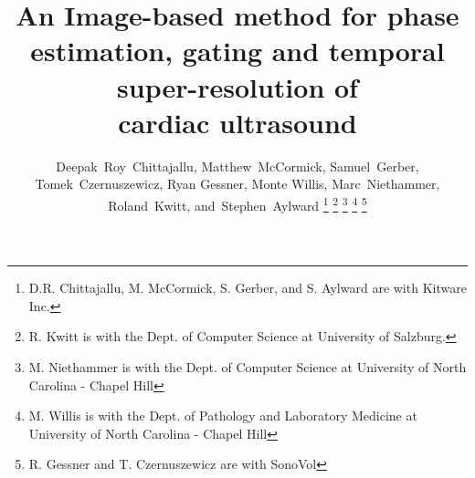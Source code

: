 \documentclass[journal]{IEEEtran}
\begin{document}
%
\title{An Image-based method for phase estimation, gating and temporal super-resolution of \\cardiac ultrasound}
%
%
%

\author{Deepak~Roy~Chittajallu,
        Matthew~McCormick,
        Samuel~Gerber,
        Tomek~Czernuszewicz,
        Ryan Gessner,
        Monte Willis,
        Marc~Niethammer,
        Roland~Kwitt,
        and~Stephen~Aylward%
\thanks{D.R. Chittajallu, M. McCormick, S. Gerber, and S. Aylward are with Kitware Inc.}%
\thanks{R. Kwitt is with the Dept. of Computer Science at University of Salzburg.}%
\thanks{M. Niethammer is with the Dept. of Computer Science at University of North Carolina - Chapel Hill}%
\thanks{M. Willis is with the Dept. of Pathology and Laboratory Medicine at University of North Carolina - Chapel Hill}%
\thanks{R. Gessner and T. Czernuszewicz are with SonoVol}%
}

% 
%
\end{document}
